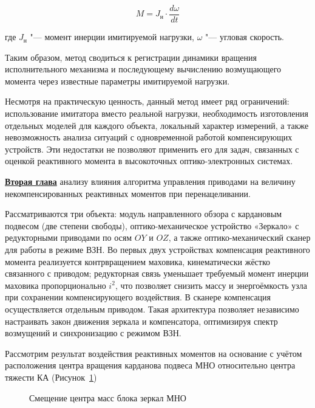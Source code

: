\begin{equation}
	\label{eq:eq_M_disturb}
	M=J_{\text{н}}\cdot \frac{d\omega}{dt}
\end{equation}

где \(J_{\text{н}}\) "--- момент инерции имитируемой нагрузки, \(\omega\) "--- угловая скорость.

Таким образом, метод сводиться к регистрации динамики вращения исполнительного механизма и последующему вычислению возмущающего момента через известные параметры имитируемой нагрузки.

Несмотря на практическую ценность, данный метод имеет ряд ограничений: использование имитатора вместо реальной нагрузки, необходимость изготовления отдельных моделей для каждого объекта, локальный характер измерений, а также невозможность анализа ситуаций с одновременной работой компенсирующих устройств. Эти недостатки не позволяют применить его для задач, связанных с оценкой реактивного момента в высокоточных оптико-электронных системах.


\underline{\textbf{Вторая глава}} анализу влияния алгоритма управления приводами  на величину некомпенсированных реактивных моментов при перенацеливании.

Рассматриваются три объекта: модуль направленного обзора с кардановым подвесом (две степени свободы), оптико-механическое устройство «Зеркало» с редукторными приводами по осям $OY$ и $OZ$, а также оптико-механический сканер для работы в режиме ВЗН. Во первых двух устройствах компенсация реактивного момента реализуется контрвращением маховика, кинематически жёстко связанного с приводом; редукторная связь уменьшает требуемый момент инерции маховика пропорционально $i^2$, что позволяет снизить массу и энергоёмкость узла при сохранении компенсирующего воздействия. В сканере компенсация осуществляется отдельным приводом. Такая архитектура позволяет независимо настраивать закон движения зеркала и компенсатора, оптимизируя спектр возмущений и синхронизацию с режимом ВЗН.

Рассмотрим результат воздействия реактивных моментов на основание с учётом расположения центра вращения карданова подвеса МНО относительно центра тяжести КА (Рисунок~\cref{fig:tikz_YPK})
\begin{figure}[h!]
	\legend{}
	\caption[Пример \texttt{tikz} схемы]{Смещение центра масс блока зеркал МНО}\label{fig:tikz_YPK}
\end{figure}

